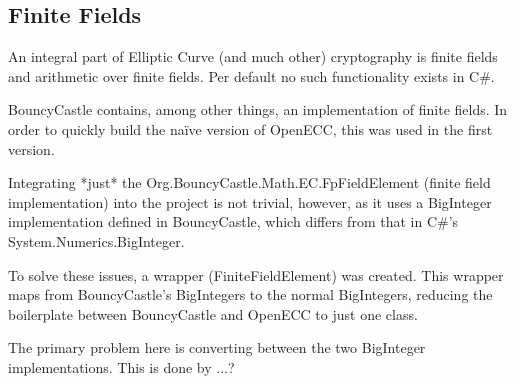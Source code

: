 \subsection{Finite Fields}

An integral part of Elliptic Curve (and much other) cryptography is finite fields and arithmetic
over finite fields. Per default no such functionality exists in C\#.

BouncyCastle contains, among other things, an implementation of finite fields. In order to quickly
build the naïve version of OpenECC, this was used in the first version.

Integrating *just* the Org.BouncyCastle.Math.EC.FpFieldElement (finite field implementation) into
the project is not trivial, however, as it uses a BigInteger implementation defined in BouncyCastle,
which differs from that in C\#'s System.Numerics.BigInteger.

To solve these issues, a wrapper (FiniteFieldElement) was created. This wrapper maps from BouncyCastle's
BigIntegers to the normal BigIntegers, reducing the boilerplate between BouncyCastle and OpenECC to
just one class.

The primary problem here is converting between the two BigInteger implementations. This is done by ...?